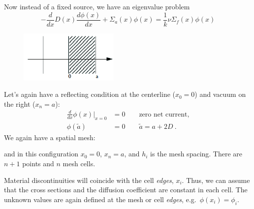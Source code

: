 \documentclass[12pt]{article}
\begin{document}
Now instead of a fixed source, we have an eigenvalue problem
\[-\frac{d}{dx}D(x)\frac{d \phi(x)}{dx} + \Sigma_a(x) \phi(x) = \frac{1}{k}\nu \Sigma_f(x) \phi(x) \]
%
\begin{figure}[h!]
\begin{center}
\includegraphics[height=1in]{FVM-fig}
\end{center}
\end{figure}
%
Let's again have a reflecting condition at the centerline ($x_0 = 0$) and vacuum on the right ($x_n = a$):
\begin{align}
\frac{d}{dx}\phi(x) \big|_{x=0} &= 0 \qquad \text{zero net current,} \nonumber\\
\phi(\tilde{a}) &= 0 \qquad \tilde{a} = a + 2D\:. \nonumber
\end{align}
%
We again have a spatial mesh:
%
\begin{center}
\end{center}
%
and in this configuration $x_0 = 0$, $x_n = a$, and $h_i$ is the mesh spacing. There are $n+1$ points and $n$ mesh cells.

Material discontinuities will coincide with the cell \textit{edges}, $x_i$. Thus, we can assume that the cross sections and the diffusion coefficient are constant in each cell.
%
%
The unknown values are again defined at the mesh or cell \textit{edges}, e.g.\ $\phi(x_i) = \phi_i$.
\end{document}
